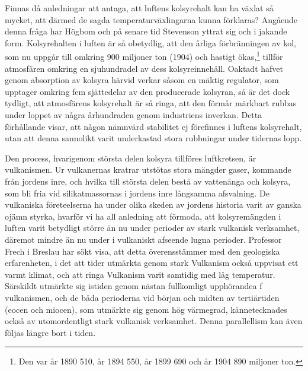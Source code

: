 \documentclass[a4paper, 12pt, oneside, swedish]{article}
\begin{document}
Finnas då anledningar att antaga, att luftens kolsyrehalt kan ha växlat så mycket, att därmed de sagda temperaturväxlingarna kunna förklaras? Angående denna fråga har Högbom och på senare tid Stevenson yttrat sig och i jakande form. Kolsyrehalten i luften är så obetydlig, att den årliga förbränningen av kol, som nu uppgår till omkring 900 miljoner ton (1904) och hastigt ökas,\footnote{Den var år 1890 510, år 1894 550, år 1899 690 och år 1904 890 miljoner ton.} tillför atmosfären omkring en sjuhundradel av dess kolsyreinnehåll. Oaktadt hafvet genom absorption av kolsyra härvid verkar såsom en mäktig regulator, som upptager omkring fem sjättedelar av den producerade kolsyran, så är det dock tydligt, att atmosfärens kolsyrehalt är så ringa, att den förmår märkbart rubbas under loppet av några århundraden genom industriens inverkan. Detta förhållande visar, att någon nämnvärd stabilitet ej förefinnes i luftens kolsyrehalt, utan att denna sannolikt varit underkastad stora rubbningar under tidernas lopp.

Den process, hvarigenom största delen kolsyra tillföres luftkretsen, är vulkanismen. Ur vulkanernas kratrar utstötas stora mängder gaser, kommande från jordens inre, och hvilka till största delen bestå av vattenånga och kolsyra, som bli fria vid silikatmassornas i jordens inre långsamma afsvalning. De vulkaniska företeelserna ha under olika skeden av jordens historia varit av ganska ojämn styrka, hvarför vi ha all anledning att förmoda, att kolsyremängden i luften varit betydligt större än nu under perioder av stark vulkanisk verksamhet, däremot mindre än nu under i vulkaniskt afseende lugna perioder. Professor Frech i Breslau har sökt visa, att detta överensstämmer med den geologiska erfarenheten, i det att tider utmärkta genom stark Vulkanism också uppvisat ett varmt klimat, och att ringa Vulkanism varit samtidig med låg temperatur. Särskildt utmärkte sig istiden genom nästan fullkomligt upphörandea f vulkanismen, och de båda perioderna vid början och midten av tertiärtiden (eocen och miocen), som utmärkte sig genom hög värmegrad, kännetecknades också av utomordentligt stark vulkanisk verksamhet. Denna parallellism kan även följas längre bort i tiden.
\end{document}
